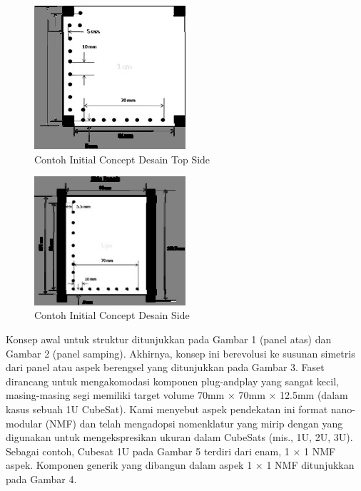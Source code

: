   \begin{figure}[ht]
\centerline{\includegraphics[width=0.5\textwidth]{figures/Aninitialconceptdesigntop.jpg}}
  \caption{Contoh Initial Concept Desain Top Side}
  \label{Aninitialconceptdesigntop}
  \end{figure}

  \begin{figure}[ht]
\centerline{\includegraphics[width=0.5\textwidth]{figures/Aninitialconceptdesignside.jpg}}
  \caption{Contoh Initial Concept Desain Side}
  \label{Aninitialconceptdesignside}
  \end{figure}

Konsep awal untuk struktur ditunjukkan pada Gambar 1 (panel atas) dan Gambar 2 (panel samping). Akhirnya, konsep ini berevolusi ke susunan simetris dari panel atau aspek berengsel yang ditunjukkan pada Gambar 3. Faset dirancang untuk mengakomodasi komponen plug-andplay yang sangat kecil, masing-masing segi memiliki target volume 70mm × 70mm × 12.5mm (dalam kasus sebuah 1U CubeSat). Kami menyebut aspek pendekatan ini format nano-modular (NMF) dan telah mengadopsi nomenklatur yang mirip dengan yang digunakan untuk mengekspresikan ukuran dalam CubeSats (mis., 1U, 2U, 3U). Sebagai contoh, Cubesat 1U pada Gambar 5 terdiri dari enam, 1 × 1 NMF aspek. Komponen generik yang dibangun dalam aspek 1 × 1 NMF ditunjukkan pada Gambar 4.

